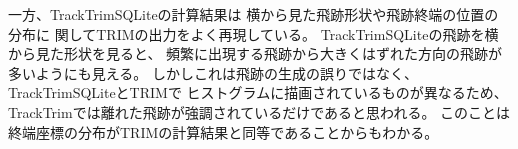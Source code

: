 \documentclass [11pt,a4paper,dvipdfmx] {jarticle}
\begin{document}
一方、TrackTrimSQLiteの計算結果は
横から見た飛跡形状や飛跡終端の位置の分布に
関してTRIMの出力をよく再現している。
TrackTrimSQLiteの飛跡を横から見た形状を見ると、
頻繁に出現する飛跡から大きくはずれた方向の飛跡が多いようにも見える。
しかしこれは飛跡の生成の誤りではなく、TrackTrimSQLiteとTRIMで
ヒストグラムに描画されているものが異なるため、
TrackTrimでは離れた飛跡が強調されているだけであると思われる。
このことは終端座標の分布がTRIMの計算結果と同等であることからもわかる。










\begin{figure}[H]
    \begin{center}
    \begin{tabular}{c c}
        

\end{tabular}
\end{center}
\end{figure}
\end{document}
